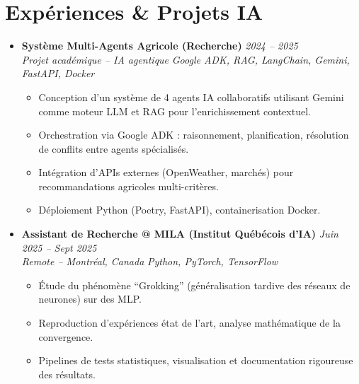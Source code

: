 \documentclass[a4paper,11pt]{article}
\begin{document}
\section{Expériences \& Projets IA}
\begin{itemize}[leftmargin=*, label={-}]

\item \textbf{Système Multi-Agents Agricole (Recherche)} \hfill \textit{2024 -- 2025} \\
\textit{Projet académique -- IA agentique} \hfill \textit{Google ADK, RAG, LangChain, Gemini, FastAPI, Docker}
\vspace{-2pt}
    \begin{itemize}[leftmargin=0.4cm, nosep, label=\tiny$\bullet$]
        \item \small{Conception d'un système de 4 agents IA collaboratifs utilisant Gemini comme moteur LLM et RAG pour l'enrichissement contextuel.}
        \item \small{Orchestration via Google ADK : raisonnement, planification, résolution de conflits entre agents spécialisés.}
        \item \small{Intégration d'APIs externes (OpenWeather, marchés) pour recommandations agricoles multi-critères.}
        \item \small{Déploiement Python (Poetry, FastAPI), containerisation Docker.}
    \end{itemize}
\vspace{3pt}

\item \textbf{Assistant de Recherche @ MILA (Institut Québécois d'IA)} \hfill \textit{Juin 2025 -- Sept 2025} \\
\textit{Remote -- Montréal, Canada} \hfill \textit{Python, PyTorch, TensorFlow}
\vspace{-2pt}
    \begin{itemize}[leftmargin=0.4cm, nosep, label=\tiny$\bullet$]
        \item \small{Étude du phénomène ``Grokking'' (généralisation tardive des réseaux de neurones) sur des MLP.}
        \item \small{Reproduction d'expériences état de l'art, analyse mathématique de la convergence.}
        \item \small{Pipelines de tests statistiques, visualisation et documentation rigoureuse des résultats.}
    \end{itemize}
\vspace{3pt}


\end{itemize}
\end{document}
